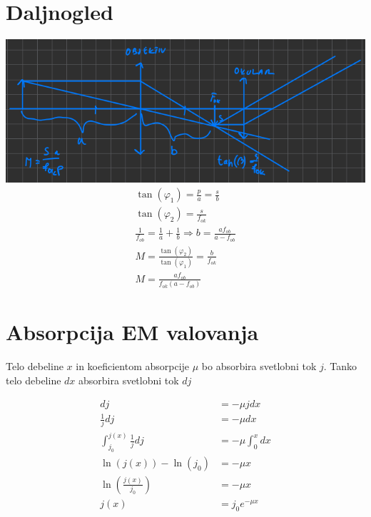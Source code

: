 \documentclass[a4paper,12pt]{article}
\begin{document}
\newpage
\section{Daljnogled}\label{sec:daljnogled}
\includegraphics[width=\textwidth]{daljnogled.png}
\begin{align}
    \tan(\varphi_1) = \frac{p}{a} = \frac{s}{b}                                              \\
    \tan(\varphi_2) = \frac{s}{f_{ok}}                                                       \\
    \frac{1}{f_{ob}} = \frac{1}{a} + \frac{1}{b} \Rightarrow b = \frac{a f_{ob}}{a - f_{ob}} \\
    M = \frac{\tan(\varphi_2)}{\tan(\varphi_1)} = \frac{b}{f_{ok}}                           \\
    M = \frac{a f_{ob}}{f_{ok} (a - f_{ob})}
\end{align}

\newpage
\section{Absorpcija EM valovanja}
Telo debeline $x$ in koeficientom absorpcije $\mu$ bo absorbira svetlobni tok $j$.
Tanko telo debeline $dx$ absorbira svetlobni tok $dj$

\begin{align}
    dj                               & = -\mu j dx            \\
    \frac{1}{j} dj                   & = -\mu dx              \\
    \int_{j_0}^{j(x)} \frac{1}{j} dj & = -\mu \int_{0}^{x} dx \\
    \ln(j(x)) - \ln(j_0)             & = -\mu x               \\
    \ln\left(\frac{j(x)}{j_0}\right) & = -\mu x               \\
    j(x)                             & = j_0 e^{-\mu x}
\end{align}
\end{document}
